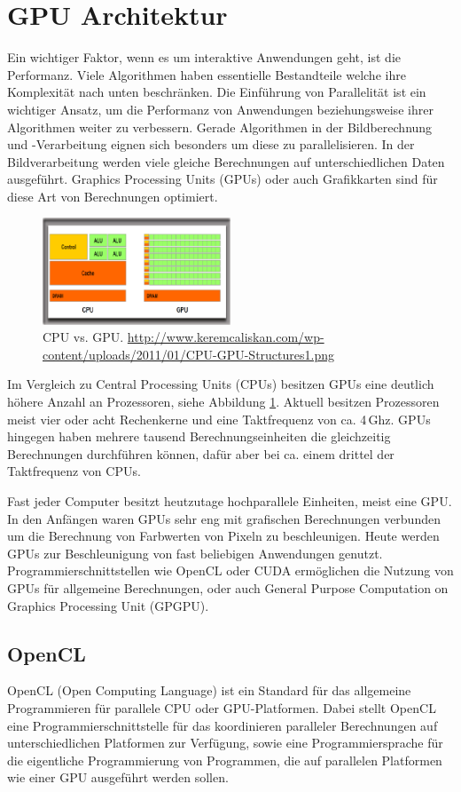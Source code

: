 \section{GPU Architektur}\label{sec::gpuarc}
Ein wichtiger Faktor, wenn es um interaktive Anwendungen geht, ist die Performanz.
Viele Algorithmen haben essentielle Bestandteile welche ihre Komplexität nach unten beschränken.
Die Einführung von Parallelität ist ein wichtiger Ansatz, um die Performanz von Anwendungen beziehungsweise ihrer Algorithmen weiter zu verbessern.
Gerade Algorithmen in der Bildberechnung und -Verarbeitung eignen sich besonders um diese zu parallelisieren.
In der Bildverarbeitung werden viele gleiche Berechnungen auf unterschiedlichen Daten ausgeführt.
Graphics Processing Units (GPUs) oder auch Grafikkarten sind für diese Art von Berechnungen optimiert.
\begin{figure}
	\centering
	\includegraphics[width=0.5\textwidth]{../../Grafiken/CPU-GPU-Structures1.png}
	\caption{CPU vs. GPU. \url{http://www.keremcaliskan.com/wp-content/uploads/2011/01/CPU-GPU-Structures1.png}}
	\label{fig::ga01}
\end{figure}
Im Vergleich zu Central Processing Units (CPUs) besitzen GPUs eine deutlich höhere Anzahl an Prozessoren, siehe Abbildung \ref{fig::ga01}.
Aktuell besitzen Prozessoren meist vier oder acht Rechenkerne und eine Taktfrequenz von ca. 4\,Ghz.
GPUs hingegen haben mehrere tausend Berechnungseinheiten die gleichzeitig Berechnungen durchführen können, dafür aber bei ca. einem drittel der Taktfrequenz von CPUs.

Fast jeder Computer besitzt heutzutage hochparallele Einheiten, meist eine GPU.
In den Anfängen waren GPUs sehr eng mit grafischen Berechnungen verbunden um die Berechnung von Farbwerten von Pixeln zu beschleunigen.
Heute werden GPUs zur Beschleunigung von fast beliebigen Anwendungen genutzt.
Programmierschnittstellen wie OpenCL oder CUDA ermöglichen die Nutzung von GPUs für allgemeine Berechnungen, oder auch General Purpose Computation on Graphics Processing Unit (GPGPU).

\subsection*{OpenCL}
OpenCL (Open Computing Language) ist ein Standard für das allgemeine Programmieren für parallele CPU oder GPU-Platformen.
Dabei stellt OpenCL eine Programmierschnittstelle für das koordinieren paralleler Berechnungen auf unterschiedlichen Platformen zur Verfügung, sowie eine Programmiersprache für die eigentliche Programmierung von Programmen, die auf parallelen Platformen wie einer GPU ausgeführt werden sollen.

